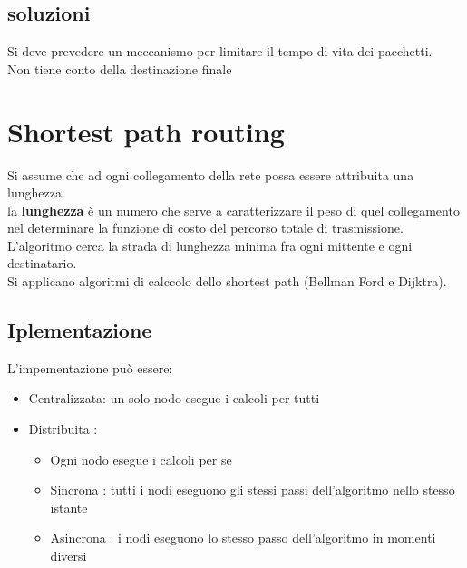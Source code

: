 \documentclass{report}
\begin{document}
            \subsection{soluzioni}
                Si deve prevedere un meccanismo per limitare il tempo di vita dei pacchetti.
                \\
                Non tiene conto della destinazione finale
        \section{Shortest path routing}
            Si assume che ad ogni collegamento della rete possa essere attribuita una lunghezza.
            \\
            la \textbf{lunghezza} è un numero che serve a caratterizzare il peso di quel collegamento nel determinare la funzione di costo del percorso totale di trasmissione.
            \\
            L'algoritmo cerca la strada di lunghezza minima fra ogni mittente e ogni destinatario.
            \\
            Si applicano algoritmi di calccolo dello shortest path (Bellman Ford e Dijktra).
            \subsection{Iplementazione}
                L'impementazione può essere:
                \begin{itemize}
                    \item Centralizzata: un solo nodo esegue i calcoli per tutti
                    \item Distribuita :
                        \begin{itemize}
                            \item  Ogni nodo esegue i calcoli per se
                            \item Sincrona : tutti i nodi eseguono gli stessi passi dell'algoritmo nello stesso istante
                            \item Asincrona : i nodi eseguono lo stesso passo dell'algoritmo in momenti diversi
                        \end{itemize}
                    \end{itemize}
\end{document}
